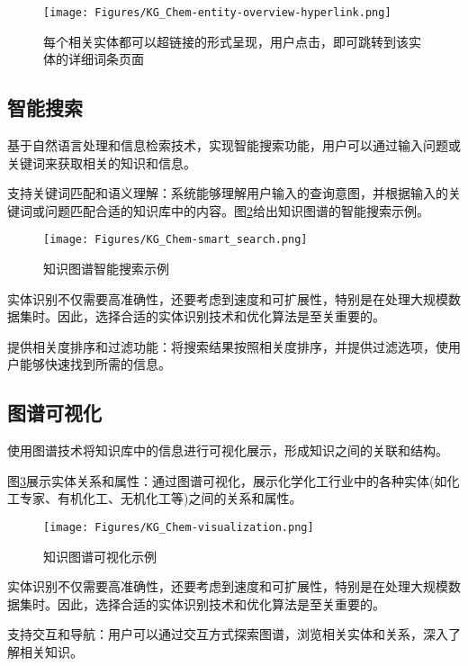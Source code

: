 \begin{figure}[h!]
\centering
\texttt{[image: Figures/KG\_Chem-entity-overview-hyperlink.png]}
\caption{\small\textrm{每个相关实体都可以超链接的形式呈现，用户点击，即可跳转到该实体的详细词条页面}}%
\label{Fig:KG-Chem_entity_overview-hyperlink}
\end{figure}

\subsection{智能搜索} 
基于自然语言处理和信息检索技术，实现智能搜索功能，用户可以通过输入问题或关键词来获取相关的知识和信息。

支持关键词匹配和语义理解：系统能够理解用户输入的查询意图，并根据输入的关键词或问题匹配合适的知识库中的内容。图\ref{Fig:KG-Chem_smart_search}给出知识图谱的智能搜索示例。
\begin{figure}[h!]
\centering
\texttt{[image: Figures/KG\_Chem-smart\_search.png]}
\caption{\small\textrm{知识图谱智能搜索示例}}%
\label{Fig:KG-Chem_smart_search}
\end{figure}
实体识别不仅需要高准确性，还要考虑到速度和可扩展性，特别是在处理大规模数据集时。因此，选择合适的实体识别技术和优化算法是至关重要的。

提供相关度排序和过滤功能：将搜索结果按照相关度排序，并提供过滤选项，使用户能够快速找到所需的信息。

\subsection{图谱可视化} 
使用图谱技术将知识库中的信息进行可视化展示，形成知识之间的关联和结构。

图\ref{Fig:KG-Chem_visualization}展示实体关系和属性：通过图谱可视化，展示化学化工行业中的各种实体(如化工专家、有机化工、无机化工等)之间的关系和属性。
\begin{figure}[h!]
\centering
\texttt{[image: Figures/KG\_Chem-visualization.png]}
\caption{\small\textrm{知识图谱可视化示例}}%
\label{Fig:KG-Chem_visualization}
\end{figure}
实体识别不仅需要高准确性，还要考虑到速度和可扩展性，特别是在处理大规模数据集时。因此，选择合适的实体识别技术和优化算法是至关重要的。

支持交互和导航：用户可以通过交互方式探索图谱，浏览相关实体和关系，深入了解相关知识。

